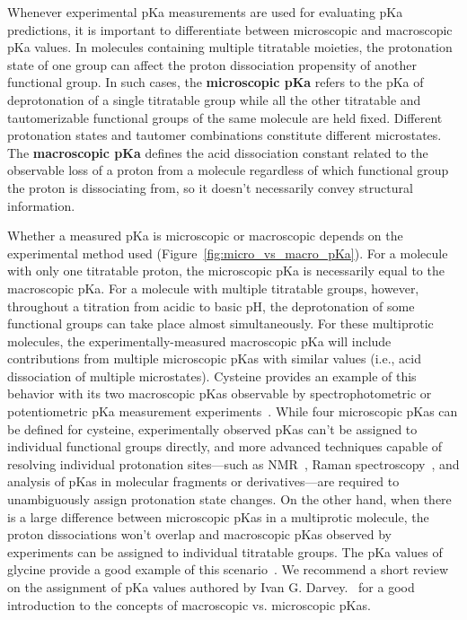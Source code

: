 \documentclass[9pt,lineno]{elife}
\begin{document}
Whenever experimental pKa measurements are used for evaluating pKa predictions, it is important to differentiate between microscopic and macroscopic pKa values. 
In molecules containing multiple titratable moieties, the protonation state of one group can affect the proton dissociation propensity of another functional group.
In such cases, the \textbf{microscopic pKa} refers to the pKa of deprotonation of a single titratable group while all the other titratable and tautomerizable functional groups of the same molecule are held fixed. 
Different protonation states and tautomer combinations constitute different microstates. 
The \textbf{macroscopic pKa} defines the acid dissociation constant related to the observable loss of a proton from a molecule regardless of which functional group the proton is dissociating from, so it doesn't necessarily convey structural information. 

Whether a measured pKa is microscopic or macroscopic depends on the experimental method used (Figure~\ref{fig:micro_vs_macro_pKa}). 
For a molecule with only one titratable proton, the microscopic pKa is necessarily equal to the macroscopic pKa. 
For a molecule with multiple titratable groups, however, throughout a titration from acidic to basic pH, the deprotonation of some functional groups can take place almost simultaneously. 
For these multiprotic molecules, the experimentally-measured macroscopic pKa will include contributions from multiple microscopic pKas with similar values (i.e., acid dissociation of multiple microstates). 
Cysteine provides an example of this behavior with its two macroscopic pKas observable by spectrophotometric or potentiometric pKa measurement experiments~\citep{darvey_assignment_1995}. 
While four microscopic pKas can be defined for cysteine, experimentally observed pKas can't be assigned to individual functional groups directly, and more advanced techniques capable of resolving individual protonation sites---such as NMR~\citep{bezencon_pka_2014}, Raman spectroscopy~\citep{elson_raman_1962, elbagerma_raman_2011}, and analysis of pKas in molecular fragments or derivatives---are required to unambiguously assign protonation state changes. 
On the other hand, when there is a large difference between microscopic pKas in a multiprotic molecule, the proton dissociations won't overlap and macroscopic pKas observed by experiments can be assigned to individual titratable groups. 
The pKa values of glycine provide a good example of this scenario~\citep{elson_raman_1962,darvey_assignment_1995}. We recommend a short review on the assignment of pKa values authored by Ivan G. Darvey.~\citep{darvey_assignment_1995} for a good introduction to the concepts of macroscopic vs. microscopic pKas.
\end{document}
